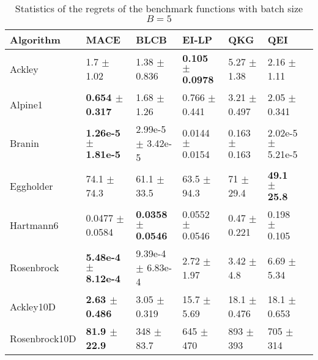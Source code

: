 \begin{table*}[!htb]
    \centering
    \caption{Statistics of the regrets of the benchmark functions with batch size $B=5$}
    \label{tab:result_analytical_b5}
    \begin{tabular}{lllllll}
        \toprule
        Algorithm     & MACE                       & BLCB                        & EI-LP                   & QKG                   & QEI                         \\ 
        \midrule
        Ackley        & 1.7             $\pm$  1.02     &  1.38           $\pm$  0.836   &  \textbf{0.105 $\pm$  0.0978} &  5.27  $\pm$  1.38   &  2.16         $\pm$  1.11      \\
        Alpine1       & \textbf{0.654   $\pm$  0.317}   &  1.68           $\pm$  1.26    &  0.766         $\pm$  0.441   &  3.21  $\pm$  0.497  &  2.05         $\pm$  0.341     \\
        Branin        & \textbf{1.26e-5 $\pm$  1.81e-5} &  2.99e-5        $\pm$  3.42e-5 &  0.0144        $\pm$  0.0154  &  0.163 $\pm$  0.163  &  2.02e-5      $\pm$  5.21e-5   \\
        Eggholder     & 74.1            $\pm$  74.3     &  61.1           $\pm$  33.5    &  63.5          $\pm$  94.3    &  71    $\pm$  29.4   &  \textbf{49.1 $\pm$  25.8}      \\
        Hartmann6     & 0.0477          $\pm$  0.0584   &  \textbf{0.0358 $\pm$  0.0546} &  0.0552        $\pm$  0.0546  &  0.47  $\pm$  0.221  &  0.198        $\pm$  0.105     \\
        Rosenbrock    & \textbf{5.48e-4 $\pm$  8.12e-4} &  9.39e-4        $\pm$  6.83e-4 &  2.72          $\pm$  1.97    &  3.42  $\pm$  4.8    &  6.69         $\pm$  5.34      \\
        Ackley10D     & \textbf{2.63    $\pm$  0.486}   &  3.05           $\pm$  0.319   &  15.7          $\pm$  5.69    &  18.1  $\pm$  0.476  &  18.1         $\pm$  0.653     \\
        Rosenbrock10D & \textbf{81.9    $\pm$  22.9}    &  348            $\pm$  83.7    &  645           $\pm$  470     &  893   $\pm$  393    &  705          $\pm$  314       \\
        \bottomrule
    \end{tabular}
\end{table*}

